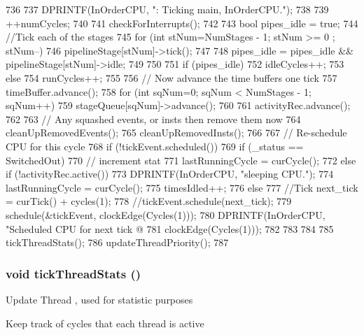 \begin{DoxyCode}
736 {
737     DPRINTF(InOrderCPU, "\n\nInOrderCPU: Ticking main, InOrderCPU.\n");
738 
739     ++numCycles;
740 
741     checkForInterrupts();
742 
743     bool pipes_idle = true;
744     //Tick each of the stages
745     for (int stNum=NumStages - 1; stNum >= 0 ; stNum--) {
746         pipelineStage[stNum]->tick();
747 
748         pipes_idle = pipes_idle && pipelineStage[stNum]->idle;
749     }
750 
751     if (pipes_idle)
752         idleCycles++;
753     else
754         runCycles++;
755     
756     // Now advance the time buffers one tick
757     timeBuffer.advance();
758     for (int sqNum=0; sqNum < NumStages - 1; sqNum++) {
759         stageQueue[sqNum]->advance();
760     }
761     activityRec.advance();
762    
763     // Any squashed events, or insts then remove them now
764     cleanUpRemovedEvents();
765     cleanUpRemovedInsts();
766 
767     // Re-schedule CPU for this cycle
768     if (!tickEvent.scheduled()) {
769         if (_status == SwitchedOut) {
770             // increment stat
771             lastRunningCycle = curCycle();
772         } else if (!activityRec.active()) {
773             DPRINTF(InOrderCPU, "sleeping CPU.\n");
774             lastRunningCycle = curCycle();
775             timesIdled++;
776         } else {
777             //Tick next_tick = curTick() + cycles(1);
778             //tickEvent.schedule(next_tick);
779             schedule(&tickEvent, clockEdge(Cycles(1)));
780             DPRINTF(InOrderCPU, "Scheduled CPU for next tick @ %
781                     clockEdge(Cycles(1)));
782         }
783     }
784 
785     tickThreadStats();
786     updateThreadPriority();
787 }
\end{DoxyCode}
\hypertarget{classInOrderCPU_a26221581dfe16c4d345ea2913d5d4d2f}{
\subsubsection[{tickThreadStats}]{\setlength{\rightskip}{0pt plus 5cm}void tickThreadStats ()}}
\label{classInOrderCPU_a26221581dfe16c4d345ea2913d5d4d2f}
Update Thread , used for statistic purposes 

Keep track of cycles that each thread is active 


